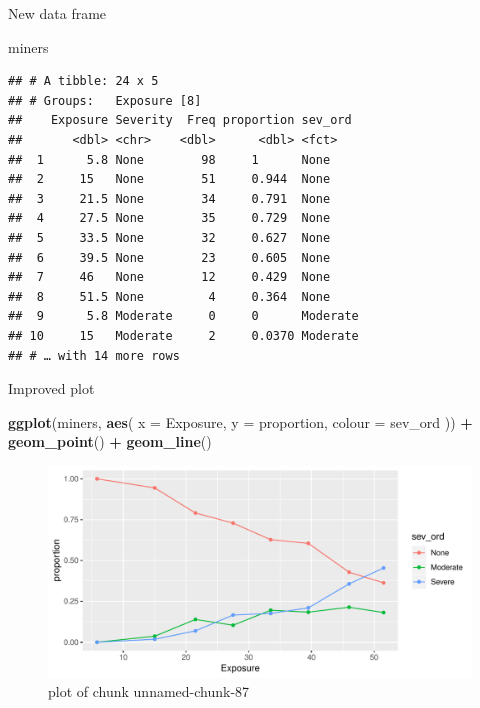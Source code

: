 \documentclass[ignorenonframetext,]{beamer}
\newenvironment{Shaded}{\begin{snugshade}}{\end{snugshade}}
\newcommand{\DataTypeTok}[1]{\textcolor[rgb]{0.13,0.29,0.53}{#1}}
\newcommand{\KeywordTok}[1]{\textcolor[rgb]{0.13,0.29,0.53}{\textbf{#1}}}
\newcommand{\NormalTok}[1]{#1}
\newcommand{\OperatorTok}[1]{\textcolor[rgb]{0.81,0.36,0.00}{\textbf{#1}}}
\newcommand{\StringTok}[1]{\textcolor[rgb]{0.31,0.60,0.02}{#1}}
\begin{document}
\begin{frame}[fragile]{New data frame}
\protect\hypertarget{new-data-frame}{}

\begin{Shaded}
\begin{Highlighting}[]
\NormalTok{miners}
\end{Highlighting}
\end{Shaded}

\begin{verbatim}
## # A tibble: 24 x 5
## # Groups:   Exposure [8]
##    Exposure Severity  Freq proportion sev_ord 
##       <dbl> <chr>    <dbl>      <dbl> <fct>   
##  1      5.8 None        98     1      None    
##  2     15   None        51     0.944  None    
##  3     21.5 None        34     0.791  None    
##  4     27.5 None        35     0.729  None    
##  5     33.5 None        32     0.627  None    
##  6     39.5 None        23     0.605  None    
##  7     46   None        12     0.429  None    
##  8     51.5 None         4     0.364  None    
##  9      5.8 Moderate     0     0      Moderate
## 10     15   Moderate     2     0.0370 Moderate
## # … with 14 more rows
\end{verbatim}

\end{frame}

\begin{frame}[fragile]{Improved plot}
\protect\hypertarget{improved-plot}{}

\begin{Shaded}
\begin{Highlighting}[]
\KeywordTok{ggplot}\NormalTok{(miners, }\KeywordTok{aes}\NormalTok{(}
  \DataTypeTok{x =}\NormalTok{ Exposure, }\DataTypeTok{y =}\NormalTok{ proportion,}
  \DataTypeTok{colour =}\NormalTok{ sev_ord}
\NormalTok{)) }\OperatorTok{+}\StringTok{ }\KeywordTok{geom_point}\NormalTok{() }\OperatorTok{+}\StringTok{ }\KeywordTok{geom_line}\NormalTok{()}
\end{Highlighting}
\end{Shaded}

\begin{figure}
\centering
\includegraphics{figure/unnamed-chunk-87-1.pdf}
\caption{plot of chunk unnamed-chunk-87}
\end{figure}

\end{frame}
\end{document}
